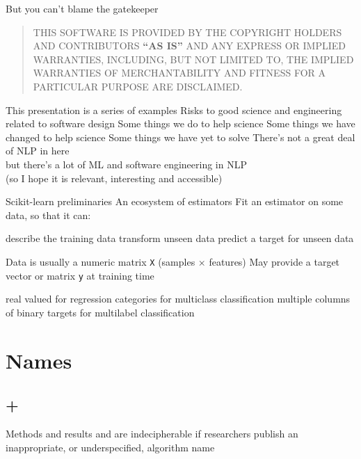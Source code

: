 \documentclass[aspectratio=169, 22pt]{beamer}
\newenvironment{sectionslide}
			{\subsection*{+}\begin{frame}[fragile,environment=sectionslide]\vfill\begin{center}\Large}
			{\end{center}\vfill\end{frame}}
\begin{document}
\begin{centre}{But you can't blame the gatekeeper}
	\begin{quote}
	THIS SOFTWARE IS PROVIDED BY THE COPYRIGHT HOLDERS AND CONTRIBUTORS \textbf{``AS IS''}
	AND ANY EXPRESS OR IMPLIED WARRANTIES, INCLUDING, BUT NOT LIMITED TO, THE
	IMPLIED WARRANTIES OF MERCHANTABILITY AND FITNESS FOR A PARTICULAR PURPOSE
	ARE DISCLAIMED.
	\end{quote}
\end{centre}



\begin{points}{This presentation is a series of examples}
	\p Risks to good science and engineering related to software design
	\vfill
	\p Some things we do to help science
	\p Some things we have changed to help science
	\p Some things we have yet to solve
	\vfill
	\p There's not a great deal of NLP in here \\
	but there's a lot of ML and software engineering in NLP\\
	(so I hope it is relevant, interesting and accessible)
\end{points}


\begin{points}{Scikit-learn preliminaries}
	\p An ecosystem of estimators
	\p Fit an estimator on some data, so that it can:
	\begin{itemize}
		\p describe the training data
		\p transform unseen data
		\p predict a target for unseen data
	\end{itemize}
	\p Data is usually a numeric matrix \verb|X| (samples $\times$ features)
	\p May provide a target vector or matrix \verb|y| at training time
	\begin{itemize}
		\p real valued for regression
		\p categories for multiclass classification
		\p multiple columns of binary targets for multilabel classification
	\end{itemize}
\end{points}


\section{Names}

\begin{sectionslide}
	Methods and results and are indecipherable if researchers publish an inappropriate, or underspecified, algorithm name
\end{sectionslide}
\end{document}
